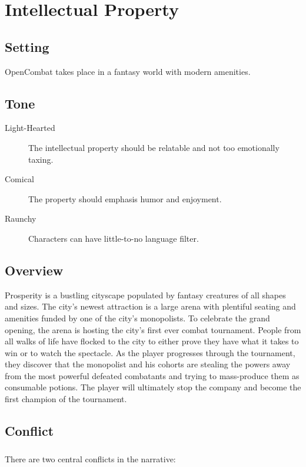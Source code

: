 \chapter{Intellectual Property}

\section{Setting}

OpenCombat takes place in a fantasy world with modern amenities.

\section{Tone}

\begin{description}
    \item[Light-Hearted] The intellectual property should be relatable and not too emotionally taxing.
    \item[Comical] The property should emphasis humor and enjoyment.
    \item[Raunchy] Characters can have little-to-no language filter.
\end{description}

\section{Overview}

Prosperity is a bustling cityscape populated by fantasy creatures of all shapes and sizes. The city's newest attraction is a large arena with plentiful seating and amenities funded by one of the city's monopolists. To celebrate the grand opening, the arena is hosting the city's first ever combat tournament. People from all walks of life have flocked to the city to either prove they have what it takes to win or to watch the spectacle. As the player progresses through the tournament, they discover that the monopolist and his cohorts are stealing the powers away from the most powerful defeated combatants and trying to mass-produce them as consumable potions. The player will ultimately stop the company and become the first champion of the tournament.

\section{Conflict}

\paragraph{} There are two central conflicts in the narrative:

